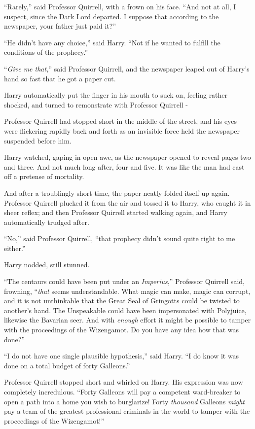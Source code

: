 ``Rarely,'' said Professor Quirrell, with a frown on his face. ``And not at all, I suspect, since the Dark Lord departed. I suppose that according to the newspaper, your father just paid it?''

``He didn't have any choice,'' said Harry. ``Not if he wanted to fulfill the conditions of the prophecy.''

``\emph{Give me that,}'' said Professor Quirrell, and the newspaper leaped out of Harry's hand so fast that he got a paper cut.

Harry automatically put the finger in his mouth to suck on, feeling rather shocked, and turned to remonstrate with Professor Quirrell -

Professor Quirrell had stopped short in the middle of the street, and his eyes were flickering rapidly back and forth as an invisible force held the newspaper suspended before him.

Harry watched, gaping in open awe, as the newspaper opened to reveal pages two and three. And not much long after, four and five. It was like the man had cast off a pretense of mortality.

And after a troublingly short time, the paper neatly folded itself up again. Professor Quirrell plucked it from the air and tossed it to Harry, who caught it in sheer reflex; and then Professor Quirrell started walking again, and Harry automatically trudged after.

``No,'' said Professor Quirrell, ``that prophecy didn't sound quite right to me either.''

Harry nodded, still stunned.

``The centaurs could have been put under an \emph{Imperius},'' Professor Quirrell said, frowning, ``\emph{that} seems understandable. What magic can make, magic can corrupt, and it is not unthinkable that the Great Seal of Gringotts could be twisted to another's hand. The Unspeakable could have been impersonated with Polyjuice, likewise the Bavarian seer. And with \emph{enough} effort it might be possible to tamper with the proceedings of the Wizengamot. Do you have any idea how that was done?''

``I do not have one single plausible hypothesis,'' said Harry. ``I do know it was done on a total budget of forty Galleons.''

Professor Quirrell stopped short and whirled on Harry. His expression was now completely incredulous. ``Forty Galleons will pay a competent ward-breaker to open a path into a home you wish to burglarize! Forty \emph{thousand} Galleons \emph{might} pay a team of the greatest professional criminals in the world to tamper with the proceedings of the Wizengamot!''

